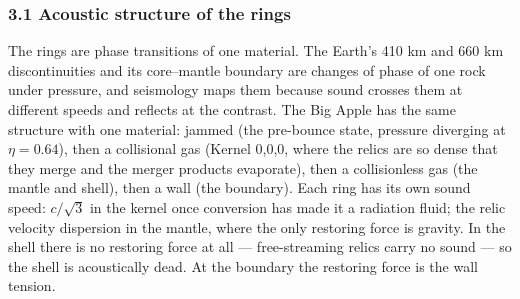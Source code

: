 \documentclass[
  11pt,
]{article}
\begin{document}
\hypertarget{acoustic-structure-of-the-rings}{%
\subsubsection{\texorpdfstring{\textbf{3.1 Acoustic structure of the
rings}}{3.1 Acoustic structure of the rings}}\label{acoustic-structure-of-the-rings}}

The rings are phase transitions of one material. The Earth's 410 km and
660 km discontinuities and its core--mantle boundary are changes of
phase of one rock under pressure, and seismology maps them because sound
crosses them at different speeds and reflects at the contrast. The Big
Apple has the same structure with one material: jammed (the pre-bounce
state, pressure diverging at \(\eta = 0.64\)), then a collisional gas
(Kernel 0,0,0, where the relics are so dense that they merge and the
merger products evaporate), then a collisionless gas (the mantle and
shell), then a wall (the boundary). Each ring has its own sound speed:
\(c/\sqrt{3}\) in the kernel once conversion has made it a radiation
fluid; the relic velocity dispersion in the mantle, where the only
restoring force is gravity. In the shell there is no restoring force at
all --- free-streaming relics carry no sound --- so the shell is
acoustically dead. At the boundary the restoring force is the wall
tension.
\end{document}
